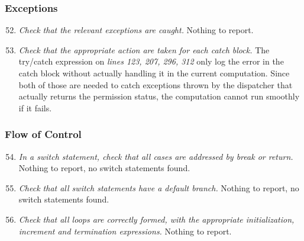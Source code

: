 	\subsubsection{Exceptions}
		\begin{enumerate}
			\setcounter{enumi}{51}
			\item \textit{Check that the relevant exceptions are caught.}\newline
			Nothing to report. %

			\item \textit{Check that the appropriate action are taken for each catch block.}
			The try/catch expression on \textit{lines 123, 207, 296, 312} only log the error in the catch block without actually handling it in the current computation. Since both of those are needed to catch exceptions thrown by the dispatcher that actually returns the permission status, the computation cannot run smoothly if it fails. 

		\end{enumerate}

	\subsubsection{Flow of Control}
		\begin{enumerate}
			\setcounter{enumi}{53}
			\item \textit{In a switch statement, check that all cases are addressed by break or return.}\newline
			Nothing to report, no switch statements found. %

			\item \textit{Check that all switch statements have a default branch.}\newline
			Nothing to report, no switch statements found. %

			\item \textit{Check that all loops are correctly formed, with the appropriate initialization, increment and termination expressions.}\newline
			Nothing to report. %

		\end{enumerate}

